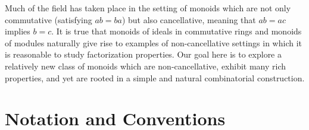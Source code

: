 
Much of the field has taken place in the setting of monoids which are not only commutative (satisfying $ab = ba$) but also cancellative, meaning that $ab = ac$ implies $b = c$.
It is true that monoids of ideals in commutative rings and monoids of modules naturally give rise to examples of non-cancellative settings in which it is reasonable to study factorization properties. 
Our goal here is to explore a relatively new class of monoids which are non-cancellative, exhibit many rich properties, and yet are rooted in a simple and natural combinatorial construction.




\section{Notation and Conventions} \label{subsec:generalities}

